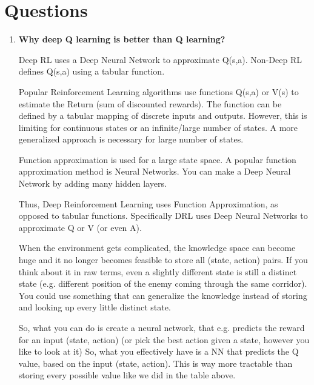 \documentclass[conference]{IEEEtran}
\begin{document}
\section{Questions}
\begin{enumerate}
\item \textbf{Why deep Q learning is better than Q learning?}


Deep RL uses a Deep Neural Network to approximate Q(s,a). Non-Deep RL defines Q(s,a) using a tabular function.

Popular Reinforcement Learning algorithms use functions Q(s,a) or V(s) to estimate the Return (sum of discounted rewards). The function can be defined by a tabular mapping of discrete inputs and outputs. However, this is limiting for continuous states or an infinite/large number of states. A more generalized approach is necessary for large number of states.

Function approximation is used for a large state space. A popular function approximation method is Neural Networks. You can make a Deep Neural Network by adding many hidden layers.

Thus, Deep Reinforcement Learning uses Function Approximation, as opposed to tabular functions. Specifically DRL uses Deep Neural Networks to approximate Q or V (or even A).

When the environment gets complicated, the knowledge space can become huge and it no longer becomes feasible to store all (state, action) pairs. If you think about it in raw terms, even a slightly different state is still a distinct state (e.g. different position of the enemy coming through the same corridor). You could use something that can generalize the knowledge instead of storing and looking up every little distinct state.

So, what you can do is create a neural network, that e.g. predicts the reward for an input (state, action) (or pick the best action given a state, however you like to look at it)
So, what you effectively have is a NN that predicts the Q value, based on the input (state, action). This is way more tractable than storing every possible value like we did in the table above.


\end{enumerate}
\end{document}
